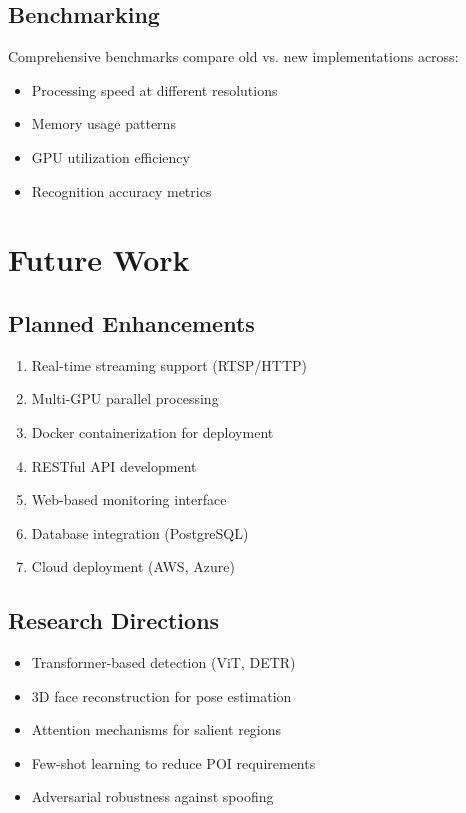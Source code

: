 \documentclass[12pt,a4paper]{article}
\begin{document}
\subsection{Benchmarking}
Comprehensive benchmarks compare old vs. new implementations across:
\begin{itemize}
\item Processing speed at different resolutions
\item Memory usage patterns
\item GPU utilization efficiency
\item Recognition accuracy metrics
\end{itemize}

\section{Future Work}

\subsection{Planned Enhancements}
\begin{enumerate}
\item Real-time streaming support (RTSP/HTTP)
\item Multi-GPU parallel processing
\item Docker containerization for deployment
\item RESTful API development
\item Web-based monitoring interface
\item Database integration (PostgreSQL)
\item Cloud deployment (AWS, Azure)
\end{enumerate}

\subsection{Research Directions}
\begin{itemize}
\item Transformer-based detection (ViT, DETR)
\item 3D face reconstruction for pose estimation
\item Attention mechanisms for salient regions
\item Few-shot learning to reduce POI requirements
\item Adversarial robustness against spoofing
\end{itemize}
\end{document}
